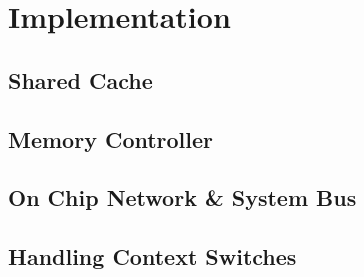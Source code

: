 \section{Implementation}
\subsection{Shared Cache}
\subsection{Memory Controller}
\subsection{On Chip Network \& System Bus}
\subsection{Handling Context Switches}
